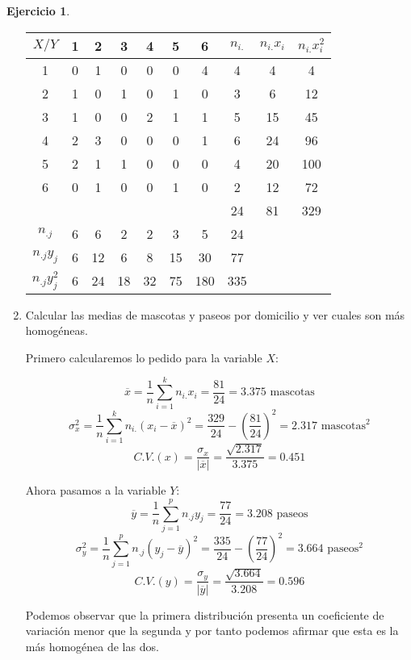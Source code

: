 \documentclass[a4paper, 12pt]{article}
\providecommand{\abs}[1]{\lvert#1\rvert}
\theoremstyle{definition}
\newtheorem{ej}{Ejercicio}
\begin{document}
\begin{ej}
\begin{enumerate}[label=\alph*)]
	\begin{center}
	\begin{tabular}{|c|c|c|c|c|c|c|c|c|c|}
	\hline
	\(X/Y\) & 1 & 2 & 3 & 4 & 5 & 6 & \(n_{i.}\) & \(n_{i.} x_i\) & \(n_{i.}x_i^2\) \\
	\hline
	1 & 0 & 1 & 0 & 0 & 0 & 4 & 4 & 4 & 4 \\
	\hline
	2 & 1 & 0 & 1 & 0 & 1 & 0 & 3 & 6 & 12 \\
	\hline
	3 & 1 & 0 & 0 & 2 & 1 & 1 & 5 & 15 & 45\\
	\hline
	4 & 2 & 3 & 0 & 0 & 0 & 1 & 6 & 24 & 96 \\
	\hline
	5 & 2 & 1 & 1 & 0 & 0 & 0 & 4 & 20 & 100 \\
	\hline
	6 & 0 & 1 & 0 & 0 & 1 & 0 & 2 & 12 & 72\\
	\hline 
	 & & & & & & & 24 & 81 & 329 \\
	\hline
	\(n_{.j}\) & 6 & 6 & 2 & 2 & 3 & 5 & 24 & & \\
	\hline
	\(n_{.j} y_j\) & 6 & 12 & 6 & 8 & 15 & 30 & 77 & & \\
	\hline
	\(n_{.j}y_j^2\) & 6 & 24 & 18 & 32 & 75 & 180 & 335 & & \\
	\hline
	\end{tabular}
	\end{center}
	
	\item Calcular las medias de mascotas y paseos por domicilio y ver cuales son más homogéneas.
	
	Primero calcularemos lo pedido para la variable \(X\):
	
\[
	\overline{x} = \frac{1}{n} \sum_{i=1}^{k} n_{i.}x_i = \frac{81}{24} = 3.375 \text{ mascotas}
\]
\[
	\sigma_x^2 = \frac{1}{n} \sum_{i=1}^{k} n_{i.} (x_i - \overline{x})^2 = \frac{329}{24} - \left(\frac{81}{24}\right)^2 = 2.317 \text{ mascotas}^2
\]
\[
	C.V.(x) = \frac{\sigma_x}{\abs{\overline{x}}} = \frac{\sqrt{2.317}}{3.375} = 0.451
\]

Ahora pasamos a la variable \(Y\):
\[
	\overline{y} = \frac{1}{n} \sum_{j=1}^{p} n_{.j} y_j = \frac{77}{24} = 3.208 \text{ paseos}
\]
\[
	\sigma_y^2 = \frac{1}{n} \sum_{j=1}^{p} n_{.j}(y_j - \overline{y})^2 = \frac{335}{24} - \left( \frac{77}{24} \right)^2 = 3.664 \text{ paseos}^2
\]
\[
	C.V.(y) = \frac{\sigma_y}{\abs{\overline{y}}} = \frac{\sqrt{3.664}}{3.208} = 0.596
\]

Podemos observar que la primera distribución presenta un coeficiente de variación menor que la segunda y por tanto podemos afirmar que esta es la más homogénea de las dos.


\end{enumerate}
\end{ej}
\end{document}

